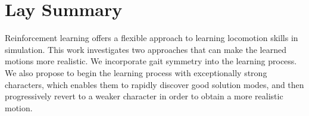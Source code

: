 

\chapter{Lay Summary}

Reinforcement learning offers a flexible approach to learning locomotion skills in simulation.
This work investigates two approaches that can make the learned motions more realistic.
We incorporate gait symmetry into the learning process. We also propose to begin the learning process with exceptionally strong characters, which enables them to rapidly discover good solution modes, and then progressively revert to a weaker character in order to obtain a more realistic motion.




